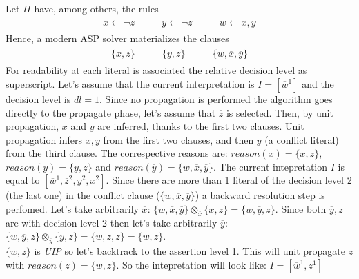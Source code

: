 \begin{example}\label{ex:unit-propagation}
    Let $\Pi$ have, among others, the rules
    \begin{align*}
        \begin{array}{ccc}
            x \leftarrow \neg z \qquad &
            y \leftarrow \neg z \qquad &
            w \leftarrow x, y
        \end{array}
    \end{align*}
    Hence, a modern ASP solver materializes the clauses
    \begin{align*}
        \begin{array}{ccc}
            \{x,z\} \qquad &
            \{y,z\} \qquad &
            \{w,\overline{x},\overline{y}\}
        \end{array}
    \end{align*}
    For readability at each literal is associated the relative decision level 
    as superscript.
    Let's assume that the current interpretation is 
    $I = [\overline{w}^1]$ and the decision level is $dl= 1$.
    Since no propagation is performed the algorithm goes 
    directly to the propagate phase, let's assume that 
    $\overline{z}$ is selected.
    Then, by unit propagation, $x$ and $y$ are inferred,
    thanks to the first two clauses.
    Unit propagation infers $x, y$ from the first two clauses, and then $y$ 
    (a conflict literal) from the third clause.
    The correspective reasons are: $reason(x) = \{ x, z \}$,
    $reason(y) = \{ y, z \}$ and $reason(\overline{y}) = \{w,\overline{x},\overline{y}\}$.
    The current intepretation $I$ is equal to
    $[\overline{w}^1,\overline{z}^2, y^2, x^2]$.
    Since there are more than 1 literal of the decision level 2 (the last one) in the conflict clause
    ($\{w,\overline{x},\overline{y}\}$)
    a backward resolution step is perfomed.
    Let's take arbitrarily $\overline{x}$:
    $\{w,\overline{x},\overline{y}\} \otimes_{\overline{x}} \{ x, z \}= \{w, \overline{y}, z\}$.
    Since both $\overline{y}, z$ are with decision level 2 then let's take arbitrarily $\overline{y}$:
    $\{w, \overline{y}, z\} \otimes_{\overline{y}} \{y,z\} = \{w, z, z\} = 
    \{w, z\}$.\\
    $\{w, z\}$ is \textit{UIP} so let's backtrack to the assertion level 1.
    This will unit propagate $z$ with $reason(z) = \{w, z\}$.
    So the intepretation will look like: $I = [\overline{w}^1, z^1]$
\end{example}



